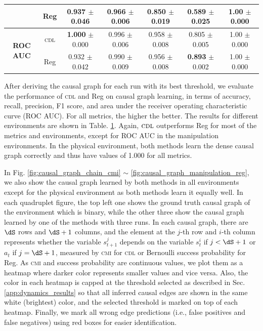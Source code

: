 \begin{table}
\begin{small}
\begin{tabular}{ccccccc}
& Reg                               & 0.937 $\pm$ 0.046            & 0.966 $\pm$ 0.006            & 0.850 $\pm$ 0.019            & 0.589 $\pm$ 0.025            & 1.00 $\pm$ 0.000   \\
\midrule
\multirow{2}{*}{\textbf{ROC AUC}}
& \textsc{cdl}                      & \textbf{1.000} $\pm$ 0.000   & 0.996 $\pm$ 0.006            & 0.958 $\pm$ 0.008            & 0.805 $\pm$ 0.005            & 1.00 $\pm$ 0.000   \\
& Reg                               & 0.932 $\pm$ 0.042            & 0.990 $\pm$ 0.009            & 0.956 $\pm$ 0.008            & \textbf{0.893} $\pm$ 0.002   & 1.00 $\pm$ 0.000   \\
\bottomrule
\end{tabular}
\end{small}
\vspace{-0pt}
\label{tab:causal_graph_quality}
\end{table}

After deriving the causal graph for each run with its best threshold, we evaluate the performance of \textsc{cdl} and Reg on causal graph learning, in terms of accuracy, recall, precision, F1 score, and area under the receiver operating characteristic curve (ROC AUC). For all metrics, the higher the better. The results for different environments are shown in Table. \ref{tab:causal_graph_quality}. Again, $\textsc{cdl}$ outperforms Reg for most of the metrics and environments, except for ROC AUC in the manipulation environments. In the physical environment, both methods learn the dense causal graph correctly and thus have values of 1.000 for all metrics.

In Fig. \ref{fig:causal_graph_chain_cmi} $\sim$ \ref{fig:causal_graph_manipulation_reg}, we also show the causal graph learned by both methods in all environments except for the physical environment as both methods learn it equally well. In each quadruplet figure, the top left one shows the ground truth causal graph of the environment which is binary, while the other three show the causal graph learned by one of the methods with three runs. In each causal graph, there are $\dS$ rows and $\dS + 1$ columns, and the element at the $j$-th row and $i$-th column represents whether the variable $s_{t+1}^j$ depends on the variable $s_t^i$ if $j < \dS + 1$ or $a_t$ if $j = \dS + 1$, measured by \textsc{cmi} for \textsc{cdl} or Bernoulli success probability for Reg. As \textsc{cmi} and success probability are continuous values, we plot them as a heatmap where darker color represents smaller values and vice versa. Also, the color in each heatmap is capped at the threshold selected as described in Sec. \ref{app:dynamics_results} so that all inferred causal edges are shown in the same white (brightest) color, and the selected threshold is marked on top of each heatmap. Finally, we mark all wrong edge predictions (i.e., false positives and false negatives) using red boxes for easier identification.


